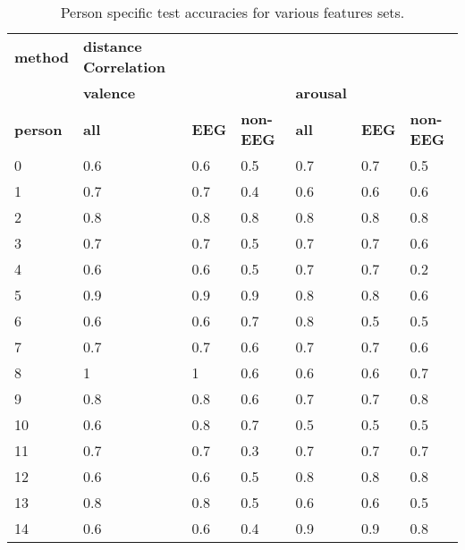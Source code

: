 \begin{table}[]
\centering
\caption{Person specific test accuracies for various features sets.}
\begin{tabular}{l|lll|lll}
\textbf{method}          & \textbf{distance Correlation} &           &         &         &     &         \\
                & \textbf{valence}              &           &         & \textbf{arousal} &     &         \\
\textbf{person}          & \textbf{all}                  & \textbf{EEG}       & \textbf{non-EEG} & \textbf{all}     & \textbf{EEG} & \textbf{non-EEG} \\ \hline 
 0               & 0.6                  & 0.6       & 0.5     & 0.7     & 0.7 & 0.5     \\
1               & 0.7                  & 0.7       & 0.4     & 0.6     & 0.6 & 0.6     \\
2               & 0.8                  & 0.8       & 0.8     & 0.8     & 0.8 & 0.8     \\
3               & 0.7                  & 0.7       & 0.5     & 0.7     & 0.7 & 0.6     \\
4               & 0.6                  & 0.6       & 0.5     & 0.7     & 0.7 & 0.2     \\
5               & 0.9                  & 0.9       & 0.9     & 0.8     & 0.8 & 0.6     \\
6               & 0.6                  & 0.6       & 0.7     & 0.8     & 0.5 & 0.5     \\
7               & 0.7                  & 0.7       & 0.6     & 0.7     & 0.7 & 0.6     \\
8               & 1                    & 1         & 0.6     & 0.6     & 0.6 & 0.7     \\
9               & 0.8                  & 0.8       & 0.6     & 0.7     & 0.7 & 0.8     \\
10              & 0.6                  & 0.8       & 0.7     & 0.5     & 0.5 & 0.5     \\
11              & 0.7                  & 0.7       & 0.3     & 0.7     & 0.7 & 0.7     \\
12              & 0.6                  & 0.6       & 0.5     & 0.8     & 0.8 & 0.8     \\
13              & 0.8                  & 0.8       & 0.5     & 0.6     & 0.6 & 0.5     \\
14              & 0.6                  & 0.6       & 0.4     & 0.9     & 0.9 & 0.8     \\

\end{tabular}
\end{table}
